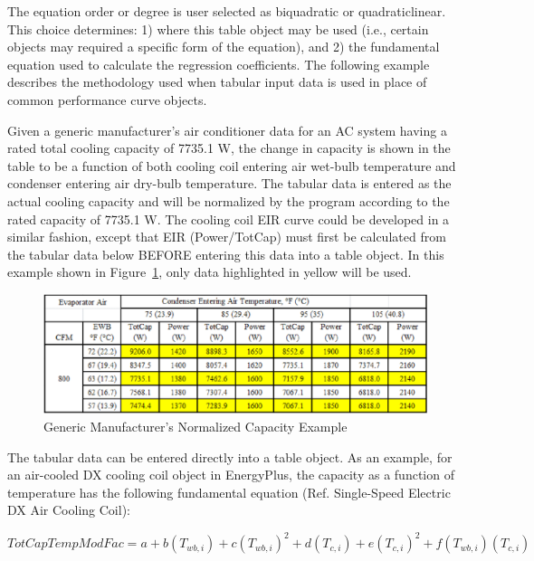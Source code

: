 The equation order or degree is user selected as biquadratic or quadraticlinear. This choice determines: 1) where this table object may be used (i.e., certain objects may required a specific form of the equation), and 2) the fundamental equation used to calculate the regression coefficients. The following example describes the methodology used when tabular input data is used in place of common performance curve objects.

Given a generic manufacturer's air conditioner data for an AC system having a rated total cooling capacity of 7735.1 W, the change in capacity is shown in the table to be a function of both cooling coil entering air wet-bulb temperature and condenser entering air dry-bulb temperature. The tabular data is entered as the actual cooling capacity and will be normalized by the program according to the rated capacity of 7735.1 W. The cooling coil EIR curve could be developed in a similar fashion, except that EIR (Power/TotCap) must first be calculated from the tabular data below BEFORE entering this data into a table object. In this example shown in Figure~\ref{fig:generic-manufacturers-normalized-capacity-example}, only data highlighted in yellow will be used.

\begin{figure}[htbp]
\centering
\includegraphics{media/image7871.png}
\caption{Generic Manufacturer's Normalized Capacity Example \protect \label{fig:generic-manufacturers-normalized-capacity-example}}
\end{figure}

The tabular data can be entered directly into a table object. As an example, for an air-cooled DX cooling coil object in EnergyPlus, the capacity as a function of temperature has the following fundamental equation (Ref. Single-Speed Electric DX Air Cooling Coil):

\begin{equation}
TotCapTempModFac = a + b\left( {{T_{wb,i}}} \right) + c{\left( {{T_{wb,i}}} \right)^2} + d\left( {{T_{c,i}}} \right) + e{\left( {{T_{c,i}}} \right)^2} + f\left( {{T_{wb,i}}} \right)\left( {{T_{c,i}}} \right)
\end{equation}


